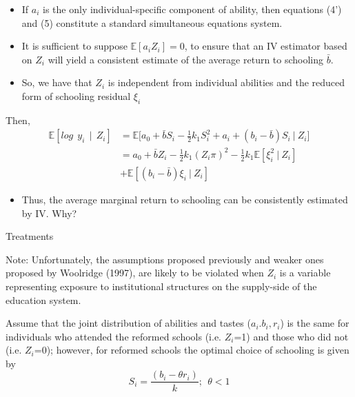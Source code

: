 \documentclass{beamer}
\begin{document}
\begin{frame}{}
\begin{itemize}
    \item If $a_{i}$ is the only individual-specific component of ability, then equations (4') and (5) constitute a standard simultaneous equations system.
    \item It is sufficient to suppose  $\mathbb{E}[a_{i}Z_{i}]=0$, to ensure that an IV estimator based on $Z_{i}$ will yield a consistent estimate of the average return to schooling $\bar{b}$.
    \item So, we have that $Z_{i}$ is independent from individual abilities and the reduced form of schooling residual $\xi_{i}$
\end{itemize}

Then, 
\begin{align*}
   \mathbb{E}[log~~y_{i}~~|~~Z_{i}] & =  \mathbb{E}\big[a_{0} + \bar{b}S_{i}-\frac{1}{2}k_{1}S_{i}^{2} + a_{i} + (b_{i}-\bar{b})S_{i}~ | ~Z_{i}\big]\\
                                    & = a_{0}+ \bar{b}Z_{i} - \frac{1}{2}k_{1}(Z_{i}\pi)^{2} - \frac{1}{2}k_{1}\mathbb{E}[\xi_{i}^{2}~|~Z_{i}]\\
                                    & + \mathbb{E}[(b_{i}-\bar{b})\xi_{i}~|~Z_{i}]
\end{align*}
 
 \begin{itemize}
     \item Thus, the average marginal return to schooling can be consistently estimated by IV. Why?
 \end{itemize}   

\end{frame}

\begin{frame}{Treatments}
\begin{block}{Note:}
Unfortunately, the assumptions proposed previously and weaker ones proposed by Woolridge (1997), are likely to be violated when $Z_{i}$ is a variable representing exposure to institutional structures on the supply-side of the education system.
\end{block}

Assume that the joint distribution of abilities and tastes ($a_{i}.b_{i},r_{i}$) is the same for individuals who attended the reformed schools (i.e. $Z_{i}$=1) and those who did not (i.e. $Z_{i}$=0); however, for reformed schools the optimal choice of schooling is given by 
\begin{equation}\tag{4''}
    S_{i}= \frac{(b_{i}-\theta r_{i})}{k};~~\theta<1
\end{equation}

\end{frame}
\end{document}
